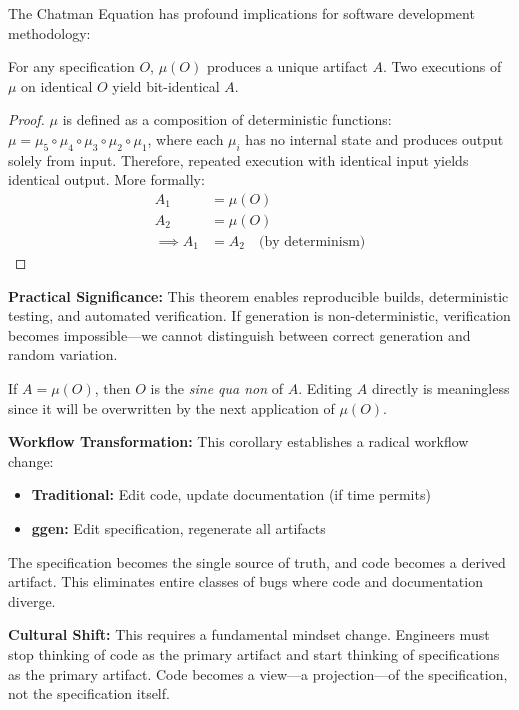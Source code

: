 The Chatman Equation has profound implications for software development methodology:

\begin{theorem}[Uniqueness]
    For any specification \(O\), \(\mu(O)\) produces a unique artifact \(A\). Two executions of \(\mu\) on identical \(O\) yield bit-identical \(A\).
\end{theorem}

\begin{proof}
    \(\mu\) is defined as a composition of deterministic functions: \(\mu = \mu_5 \circ \mu_4 \circ \mu_3 \circ \mu_2 \circ \mu_1\), where each \(\mu_i\) has no internal state and produces output solely from input. Therefore, repeated execution with identical input yields identical output. More formally:
    \begin{align}
        A_1 &= \mu(O) \\
        A_2 &= \mu(O) \\
        \implies A_1 &= A_2 \quad \text{(by determinism)}
    \end{align}
\end{proof}

\textbf{Practical Significance:} This theorem enables reproducible builds, deterministic testing, and automated verification. If generation is non-deterministic, verification becomes impossible---we cannot distinguish between correct generation and random variation.

\begin{corollary}
    If \(A = \mu(O)\), then \(O\) is the \textit{sine qua non} of \(A\). Editing \(A\) directly is meaningless since it will be overwritten by the next application of \(\mu(O)\).
\end{corollary}

\textbf{Workflow Transformation:} This corollary establishes a radical workflow change:
\begin{itemize}
    \item \textbf{Traditional:} Edit code, update documentation (if time permits)
    \item \textbf{ggen:} Edit specification, regenerate all artifacts
\end{itemize}

The specification becomes the single source of truth, and code becomes a derived artifact. This eliminates entire classes of bugs where code and documentation diverge.

\textbf{Cultural Shift:} This requires a fundamental mindset change. Engineers must stop thinking of code as the primary artifact and start thinking of specifications as the primary artifact. Code becomes a view---a projection---of the specification, not the specification itself.

